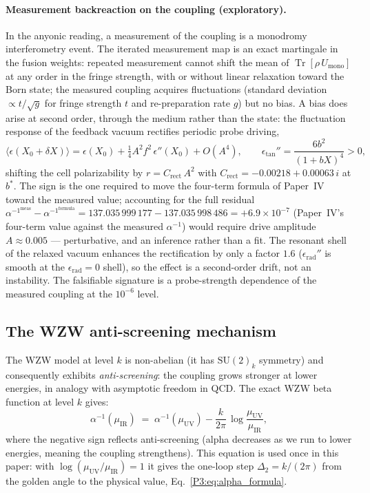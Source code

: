 \documentclass[11pt,a4paper]{article}
\theoremstyle{definition}
\theoremstyle{remark}
\newcommand{\aInv}{\alpha^{-1}}
\begin{document}
\paragraph{Measurement backreaction on the coupling (exploratory).}
In the anyonic reading, a measurement of the coupling is a monodromy
interferometry event. The iterated measurement map is an exact
martingale in the fusion weights: repeated measurement cannot shift
the mean of $\operatorname{Tr}[\rho\,U_{\mathrm{mono}}]$ at any order
in the fringe strength, with or without linear relaxation toward the
Born state; the measured coupling acquires fluctuations (standard
deviation $\propto t/\sqrt{g}$ for fringe strength $t$ and
re-preparation rate $g$) but no bias. A bias does arise at second
order, through the medium rather than the state: the fluctuation
response of the feedback vacuum rectifies periodic probe driving,
\[
  \langle \epsilon(X_0 + \delta X) \rangle
  = \epsilon(X_0) + \tfrac{1}{4}A^2 f^2\,\epsilon''(X_0) + O(A^4),
  \qquad
  \epsilon_{\tan}'' = \frac{6b^2}{(1+bX)^4} > 0,
\]
shifting the cell polarizability by $r = C_{\mathrm{rect}}\,A^2$ with
$C_{\mathrm{rect}} = -0.00218 + 0.00063\,i$ at $b^*$. The sign is the
one required to move the four-term formula of
Paper~IV~\cite{Paper4} toward the measured value; accounting for the
full residual $\aInv^{\mathrm{meas}} - \aInv^{\mathrm{formula}} =
137.035\,999\,177 - 137.035\,998\,486 = +6.9\times10^{-7}$ (Paper~IV's
four-term value against the measured $\aInv$) would require drive
amplitude $A \approx 0.005$
--- perturbative, and an inference rather than a fit. The resonant
shell of the relaxed vacuum enhances the rectification by only a
factor $1.6$ ($\epsilon_{\mathrm{rad}}''$ is smooth at the
$\epsilon_{\mathrm{rad}}=0$ shell), so the effect is a second-order
drift, not an instability. The falsifiable signature is a
probe-strength dependence of the measured coupling at the
$10^{-6}$ level.

\subsection{The WZW anti-screening mechanism}

The WZW model at level $k$ is non-abelian (it has $\mathrm{SU}(2)_k$
symmetry) and consequently exhibits \emph{anti-screening}: the coupling
grows stronger at lower energies, in analogy with asymptotic freedom
in QCD.  The exact WZW beta function at level $k$ gives:
\begin{equation}
  \aInv(\mu_{\mathrm{IR}})
  \;=\; \aInv(\mu_{\mathrm{UV}})
        - \frac{k}{2\pi}\,\log\frac{\mu_{\mathrm{UV}}}{\mu_{\mathrm{IR}}},
  \label{P3:eq:wzw_running}
\end{equation}
where the negative sign reflects anti-screening (alpha decreases
as we run to lower energies, meaning the coupling strengthens).  This
equation is used once in this paper: with
$\log(\mu_{\mathrm{UV}}/\mu_{\mathrm{IR}})=1$ it gives the one-loop
step $\Delta_2=k/(2\pi)$ from the golden angle to the physical value,
Eq.~\eqref{P3:eq:alpha_formula}.
\end{document}
